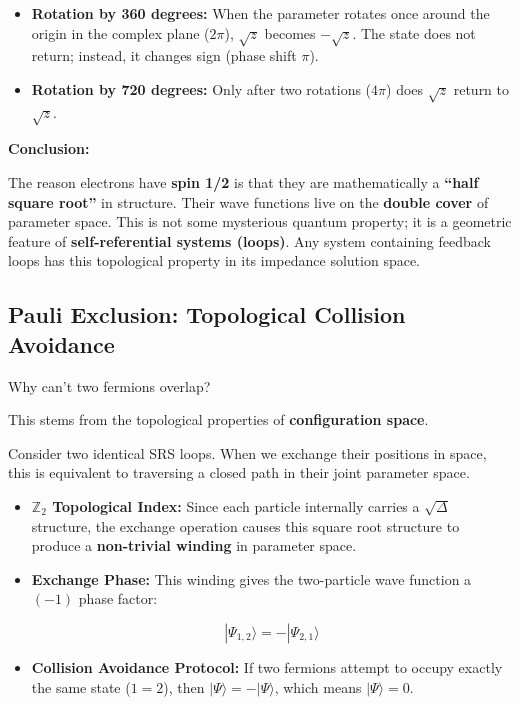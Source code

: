 \begin{itemize}
\item \textbf{Rotation by 360 degrees:} When the parameter rotates once around the origin in the complex plane ($2\pi$), $\sqrt{z}$ becomes $-\sqrt{z}$. The state does not return; instead, it changes sign (phase shift $\pi$).

\item \textbf{Rotation by 720 degrees:} Only after two rotations ($4\pi$) does $\sqrt{z}$ return to $\sqrt{z}$.
\end{itemize}

\textbf{Conclusion:}

The reason electrons have \textbf{spin 1/2} is that they are mathematically a \textbf{``half square root''} in structure. Their wave functions live on the \textbf{double cover} of parameter space. This is not some mysterious quantum property; it is a geometric feature of \textbf{self-referential systems (loops)}. Any system containing feedback loops has this topological property in its impedance solution space.

\subsection{Pauli Exclusion: Topological Collision Avoidance}

Why can't two fermions overlap?

This stems from the topological properties of \textbf{configuration space}.

Consider two identical SRS loops. When we exchange their positions in space, this is equivalent to traversing a closed path in their joint parameter space.

\begin{itemize}
\item \textbf{$\mathbb{Z}_2$ Topological Index:} Since each particle internally carries a $\sqrt{\Delta}$ structure, the exchange operation causes this square root structure to produce a \textbf{non-trivial winding} in parameter space.

\item \textbf{Exchange Phase:} This winding gives the two-particle wave function a \textbf{$(-1)$} phase factor:

    $$|\Psi_{1,2}\rangle = - |\Psi_{2,1}\rangle$$

\item \textbf{Collision Avoidance Protocol:} If two fermions attempt to occupy exactly the same state ($1=2$), then $|\Psi\rangle = -|\Psi\rangle$, which means $|\Psi\rangle = 0$.
\end{itemize}

